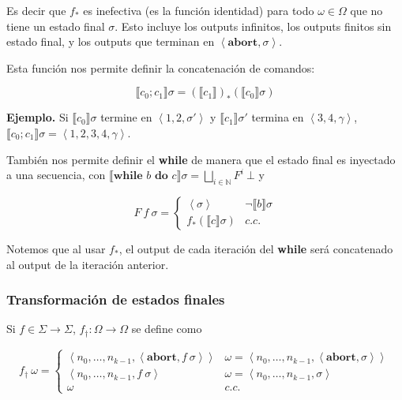 \documentclass[a4paper, 12pt]{article}
\begin{document}
Es decir que $f_*$ es inefectiva (es la función identidad) para todo $\omega \in
\Omega$ que no tiene un estado final $\sigma$. Esto incluye los outputs infinitos, los
outputs finitos sin estado final, y los outputs que terminan en
$\left<\textbf{abort}, \sigma \right>$.

Esta función nos permite definir la concatenación de comandos:

\begin{equation*}
  \llbracket c_0;c_1 \rrbracket \sigma = \left( \llbracket c_1 \rrbracket
  \right)_* \left( \llbracket c_0 \rrbracket \sigma \right) 
\end{equation*}

\textbf{Ejemplo.} Si $\llbracket c_0 \rrbracket \sigma$ termine en $\left<1, 2,
\sigma'\right>$ y $\llbracket c_1 \rrbracket\sigma'$ termina en $\left<3, 4
, \gamma\right>$, $\llbracket c_0;c_1 \rrbracket\sigma = \left<1, 2, 3, 4
, \gamma\right>$.

También nos permite definir el \textbf{while} de manera que el estado final es
inyectado a una secuencia, con $\llbracket \textbf{while } b \textbf{ do } c
\rrbracket\sigma = \bigsqcup_{i \in \mathbb{N}} F^i ~ \bot $ y

\begin{equation*}
  F ~ f ~ \sigma = \begin{cases}
    \left<\sigma \right> & \neg\llbracket b \rrbracket\sigma \\ 
    f_* (\llbracket c \rrbracket \sigma) & c.c.
  \end{cases}
\end{equation*}

Notemos que al usar $f_*$, el output de cada iteración del \textbf{while} será
concatenado al output de la iteración anterior.

\subsubsection{Transformación de estados finales}

Si $f \in \Sigma \to  \Sigma$, $f_\dagger : \Omega\to \Omega$ se define como 

\begin{equation*}
  f_\dagger ~ \omega = \begin{cases}
    \left<n_0, \ldots, n_{k-1}, \left<\textbf{abort}, f ~ \sigma \right> \right>
    & \omega = \left<n_0,\ldots, n_{k-1}, \left<\textbf{abort}, \sigma \right>
    \right> \\ 
    \left<n_0, \ldots, n_{k-1}, f ~ \sigma \right> & \omega = \left< n_0,
    \ldots, n_{k-1}, \sigma\right> \\ 
    \omega & c.c.
  \end{cases}
\end{equation*}
\end{document}
